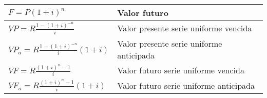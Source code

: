 \begin{spacing}{1}
\begin{center}
\begin{tabular}{ |p{7cm}|p{7cm}|}
			$F = P(1 + i)^n$                                                                             & Valor futuro                                               \\ \hline
			
			$VP = R  \frac{1-(1 + i)^{-n}}{i} $                                                          & Valor presente serie uniforme vencida                      \\ \hline
			
			$VP_{a} = R  \frac{1-(1 + i)^{-n}}{i}  (1 + i) $                                             & Valor presente serie uniforme anticipada                   \\ \hline
			
			$VF = R  \frac{(1 + i)^n-1}{i} $                                                             & Valor futuro serie uniforme vencida                        \\ \hline
			$VF_{a} = R  \frac{(1 + i)^n-1}{i}(1 + i) $                                                  & Valor futuro serie uniforme anticipada                     \\ \hline
			

\end{tabular}
\end{center}
\end{spacing}

